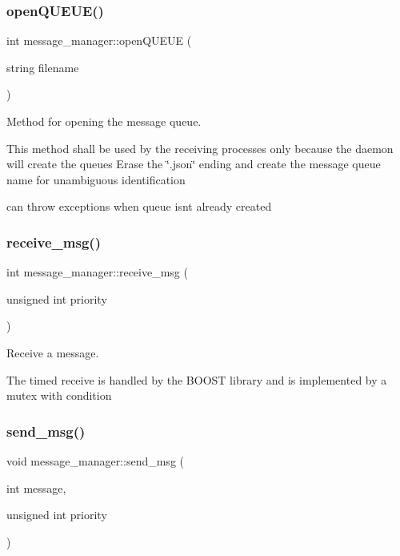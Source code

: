 \subsubsection{\texorpdfstring{open\+Q\+U\+E\+U\+E()}{openQUEUE()}}
{\footnotesize\ttfamily int message\+\_\+manager\+::open\+Q\+U\+E\+UE (\begin{DoxyParamCaption}\item[{string}]{filename }\end{DoxyParamCaption})}



Method for opening the message queue. 

This method shall be used by the receiving processes only because the daemon will create the queues Erase the \char`\"{}.\+json\char`\"{} ending and create the message queue name for unambiguous identification

can throw exceptions when queue isnt already created \mbox{\label{classmessage__manager_a186a0f3b9e4e0a34a26f57f118a9dad7}} 
\subsubsection{\texorpdfstring{receive\+\_\+msg()}{receive\_msg()}}
{\footnotesize\ttfamily int message\+\_\+manager\+::receive\+\_\+msg (\begin{DoxyParamCaption}\item[{unsigned int}]{priority }\end{DoxyParamCaption})}



Receive a message. 

The timed receive is handled by the B\+O\+O\+ST library and is implemented by a mutex with condition \mbox{\label{classmessage__manager_a1f802ec26eed0834f69988f43f194273}} 
\subsubsection{\texorpdfstring{send\+\_\+msg()}{send\_msg()}}
{\footnotesize\ttfamily void message\+\_\+manager\+::send\+\_\+msg (\begin{DoxyParamCaption}\item[{int}]{message,  }\item[{unsigned int}]{priority }\end{DoxyParamCaption})}



